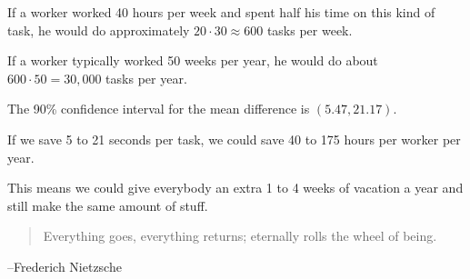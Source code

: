 \documentclass[letterpaper, landscape]{exam}
\begin{document}
\begin{description}
        If a worker worked 40 hours per week and spent half his time on this
        kind of task, he would do approximately $20 \cdot 30 \approx 600$ tasks
        per week. 
        
        If a worker typically worked 50 weeks per year, he would do about $600
        \cdot 50 = 30,000$ tasks per year.

        The 90\% confidence interval for the mean difference is $(5.47, 21.17)$.

        If we save 5 to 21 seconds per task, we could save 40 to 175 hours per
        worker per year. 

        This means we could give everybody an extra 1 to 4 weeks of vacation a
        year and still make the same amount of stuff.

  \end{description}

  \else
    \vspace{12 cm}
    \begin{quote}
      \begin{em}
        Everything goes, everything returns; eternally rolls the wheel of
        being.
      \end{em}
    \end{quote}
    \hspace{1 cm}--Frederich Nietzsche
  \fi
\end{document}
